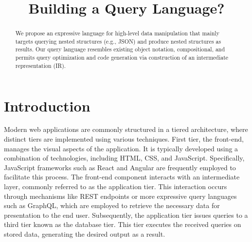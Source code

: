 \documentclass[runningheads]{llncs}
\begin{document}
%
\title{Building a Query Language?}

%
%
%
\maketitle              %
%
\begin{abstract}
We propose an expressive language for high-level data manipulation that
mainly targets querying nested structures (e.g., JSON) and produce nested
structures as results.
Our query language resembles existing object notation, compositional, and
permits query optimization and code generation via construction of an
intermediate representation (IR).


\end{abstract}
%
%
%
\section{Introduction}

Modern web applications are commonly structured in a tiered architecture, where distinct
tiers are implemented using various techniques.
First tier, the front-end, manages the visual aspects of the application.
It is typically developed using a combination of technologies, including HTML,
CSS, and JavaScript.
Specifically, JavaScript frameworks such as React and Angular are frequently employed to
facilitate this process.
The front-end component interacts with an intermediate layer, commonly referred to as
the application tier. 
This interaction occurs through mechanisms like REST endpoints or more expressive query
languages such as GraphQL, which are employed to retrieve the necessary data for
presentation to the end user.
Subsequently, the application tier issues queries to a third tier known as the database tier.
This tier executes the received queries on stored data, generating the desired output
as a result.
\end{document}
